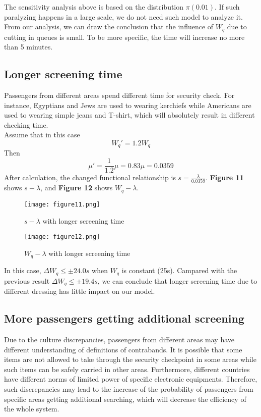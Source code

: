 \documentclass{mcmthesis}
\begin{document}
	The sensitivity analysis above is based on the distribution $\pi(0.01)$. If such paralyzing happens in a large scale, we do not need such model to analyze it. From our analysis, we can draw the conclusion that the influence of $W_q$ due to cutting in queues is small. To be more specific, the time will increase no more than 5 minutes.
	
	\subsection{Longer screening time}
	Passengers from different areas spend different time for security check. For instance, Egyptians and Jews are used to wearing kerchiefs while Americans are used to wearing simple jeans and T-shirt, which will absolutely result in different checking time.\\
	Assume that in this case 
	$$W_q'=1.2W_q$$ 
	Then 
	$$\mu'=\frac{1}{1.2}\mu=0.83\mu=0.0359$$ 
	After calculation, the changed functional relationship is $s=\frac{\lambda }{0.0359}$. \textbf{Figure 11} shows $s-\lambda$, and \textbf{Figure 12} shows $W_q-\lambda$.
	\begin{figure}[H]
		\small
		\centering
		\texttt{[image: figure11.png]}
		\caption{$s-\lambda$ with longer screening time} \label{fig:11}
	\end{figure}
	\begin{figure}[h]
		\small
		\centering
		\texttt{[image: figure12.png]}
		\caption{$W_q-\lambda$ with longer screening time} \label{fig:12}
	\end{figure}
	In this case, $\Delta W_q\leq \pm 24.0s$ when $W_q$ is constant (25s). Campared with the previous result $\Delta W_q\leq \pm 19.4s$, we can conclude that longer screening time due to different dressing has little impact on our model.
	
	\subsection{More passengers getting additional screening}
	Due to the culture discrepancies, passengers from different areas may have different understanding of definitions of contrabands. It is possible that some items are not allowed to take through the security checkpoint in some areas while such items can be safely carried in other areas. Furthermore, different countries have different norms of limited power of specific electronic equipments. Therefore, such discrepancies may lead to the increase of the probability of passengers from specific areas getting additional searching, which will decrease the efficiency of the whole system.
	
\end{document}

